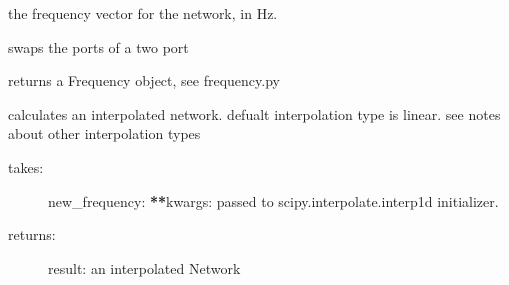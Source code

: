 \documentclass[letterpaper,10pt,english]{sphinxmanual}
\begin{document}
\begin{fulllineitems}
\begin{fulllineitems}
\begin{description}
\end{description}

\end{fulllineitems}


\begin{fulllineitems}
\label{auto_network:mwavepy.Network.change_frequency}
\end{fulllineitems}


\begin{fulllineitems}
\label{auto_network:mwavepy.Network.f}
the frequency vector for the network, in Hz.

\end{fulllineitems}


\begin{fulllineitems}
\label{auto_network:mwavepy.Network.flip}
swaps the ports of a two port

\end{fulllineitems}


\begin{fulllineitems}
\label{auto_network:mwavepy.Network.frequency}
returns a Frequency object, see  frequency.py

\end{fulllineitems}


\begin{fulllineitems}
\label{auto_network:mwavepy.Network.interpolate}
calculates an interpolated network. defualt interpolation type
is linear. see notes about other interpolation types
\begin{description}
\item[{takes:}] \leavevmode
new\_frequency:
{\color{red}\bfseries{}**}kwargs: passed to scipy.interpolate.interp1d initializer.

\item[{returns:}] \leavevmode
result: an interpolated Network


\end{description}
\end{fulllineitems}
\end{fulllineitems}
\end{document}
